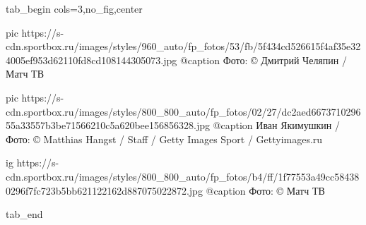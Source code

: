  
 
 
 
 


\ifcmt
  tab_begin cols=3,no_fig,center

     pic https://s-cdn.sportbox.ru/images/styles/960_auto/fp_fotos/53/fb/5f434cd526615f4af35e324005ef953d62110fd8cd108144305073.jpg
		 @caption Фото: © Дмитрий Челяпин / Матч ТВ 

		 pic https://s-cdn.sportbox.ru/images/styles/800_800_auto/fp_fotos/02/27/dc2aed667371029655a33557b3be71566210c5a620bee156856328.jpg
		 @caption Иван Якимушкин / Фото: © Matthias Hangst / Staff / Getty Images Sport / Gettyimages.ru

  	 ig https://s-cdn.sportbox.ru/images/styles/800_800_auto/fp_fotos/b4/ff/1f77553a49cc584380296f7fc723b5bb621122162d887075022872.jpg
		 @caption Фото: © Матч ТВ

  tab_end
\fi
